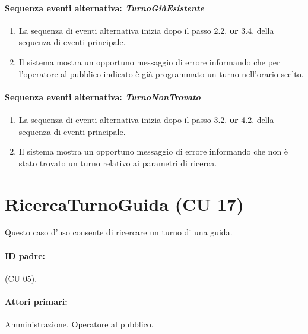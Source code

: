 \documentclass{article}
\begin{document}
	\paragraph{Sequenza eventi alternativa: \textit{TurnoGiàEsistente}}
	\begin{enumerate}	[leftmargin=28pt]
			\item  La sequenza di eventi alternativa inizia dopo il passo 2.2. \textbf{or} 3.4. della sequenza di eventi principale.
			\item  Il sistema mostra un opportuno messaggio di errore informando che per l'operatore al pubblico indicato è già programmato un turno nell'orario scelto.
		\end{enumerate}
		
	\paragraph{Sequenza eventi alternativa: \textit{TurnoNonTrovato}}
	\begin{enumerate}	[leftmargin=28pt]
			\item  La sequenza di eventi alternativa inizia dopo il passo 3.2. \textbf{or} 4.2. della sequenza di eventi principale.
			\item  Il sistema mostra un opportuno messaggio di errore informando che non è stato trovato un turno relativo ai parametri di ricerca.
		\end{enumerate}
	
	
	
	
	
	
	
	

	
	
\newpage 

		\section*{RicercaTurnoGuida (CU 17)}
	
	\indent\indent Questo caso d'uso consente di ricercare un turno di una guida. 

	\paragraph{ID padre:}(CU 05).
	
	\paragraph{Attori primari:}Amministrazione, Operatore al pubblico.
	
\end{document}
